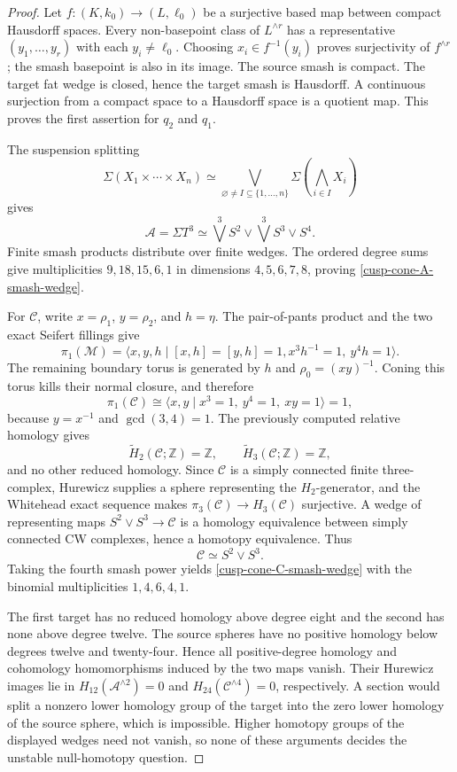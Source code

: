 \begin{proof}
Let \(f:(K,k_0)\to(L,\ell_0)\) be a surjective based map between compact
Hausdorff spaces.  Every non-basepoint class of \(L^{\wedge r}\) has a
representative \((y_1,\ldots,y_r)\) with each \(y_i\ne\ell_0\).  Choosing
\(x_i\in f^{-1}(y_i)\) proves surjectivity of \(f^{\wedge r}\); the smash
basepoint is also in its image.  The source smash is compact.  The target
fat wedge is closed, hence the target smash is Hausdorff.  A continuous
surjection from a compact space to a Hausdorff space is a quotient map.
This proves the first assertion for \(q_2\) and \(q_1\).

The suspension splitting
\[
 \Sigma(X_1\times\cdots\times X_n)
 \simeq
 \bigvee_{\varnothing\ne I\subseteq\{1,\ldots,n\}}
 \Sigma\!\left(\bigwedge_{i\in I}X_i\right)
\]
gives
\[
 \mathcal A=\Sigma T^3
 \simeq\bigvee^3S^2\vee\bigvee^3S^3\vee S^4.
\]
Finite smash products distribute over finite wedges.  The ordered degree
sums give multiplicities \(9,18,15,6,1\) in dimensions
\(4,5,6,7,8\), proving \cref{cusp-cone-A-smash-wedge}.

For \(\mathcal C\), write \(x=\rho_1\), \(y=\rho_2\), and
\(h=\eta\).  The pair-of-pants product and the two exact Seifert fillings
give
\[
 \pi_1(\mathcal M)=
 \langle x,y,h\mid[x,h]=[y,h]=1,
 x^3h^{-1}=1,\ y^4h=1\rangle.
\]
The remaining boundary torus is generated by \(h\) and
\(\rho_0=(xy)^{-1}\).  Coning this torus kills their normal closure, and
therefore
\[
 \pi_1(\mathcal C)
 \cong\langle x,y\mid x^3=1,\ y^4=1,\ xy=1\rangle=1,
\]
because \(y=x^{-1}\) and \(\gcd(3,4)=1\).  The previously computed
relative homology gives
\[
 \widetilde H_2(\mathcal C;\mathbb Z)=\mathbb Z,
 \qquad
 \widetilde H_3(\mathcal C;\mathbb Z)=\mathbb Z,
\]
and no other reduced homology.  Since \(\mathcal C\) is a simply connected
finite three-complex, Hurewicz supplies a sphere representing the
\(H_2\)-generator, and the Whitehead exact sequence makes
\(\pi_3(\mathcal C)\to H_3(\mathcal C)\) surjective.  A wedge of
representing maps
\(S^2\vee S^3\to\mathcal C\) is a homology equivalence between simply
connected CW complexes, hence a homotopy equivalence.  Thus
\[
 \mathcal C\simeq S^2\vee S^3.
\]
Taking the fourth smash power yields \cref{cusp-cone-C-smash-wedge} with
the binomial multiplicities \(1,4,6,4,1\).

The first target has no reduced homology above degree eight and the second
has none above degree twelve.  The source spheres have no positive homology
below degrees twelve and twenty-four.  Hence all positive-degree homology
and cohomology homomorphisms induced by the two maps vanish.  Their
Hurewicz images lie in \(H_{12}(\mathcal A^{\wedge2})=0\) and
\(H_{24}(\mathcal C^{\wedge4})=0\), respectively.  A section would split a
nonzero lower homology group of the target into the zero lower homology of
the source sphere, which is impossible.  Higher homotopy groups of the
displayed wedges need not vanish, so none of these arguments decides the
unstable null-homotopy question.
\end{proof}

